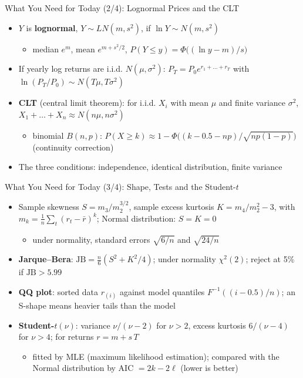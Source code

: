 \begin{frame}{What You Need for Today (2/4): Lognormal Prices and the CLT}
\itemsize{\footnotesize}
\begin{itemize}
    \item $Y$ is \textbf{lognormal}, $Y \sim LN(m, s^2)$, if $\ln Y \sim N(m, s^2)$
    \begin{itemize}
        \item median $e^m$, mean $e^{m + s^2/2}$, $P(Y \le y) = \Phi\big((\ln y - m)/s\big)$
    \end{itemize}
    \item If yearly log returns are i.i.d. $N(\mu, \sigma^2)$: $P_T = P_0 e^{r_1 + \dots + r_T}$ with $\ln(P_T/P_0) \sim N(T\mu, T\sigma^2)$
    \item \textbf{CLT} (central limit theorem): for i.i.d. $X_i$ with mean $\mu$ and finite variance $\sigma^2$, $X_1 + \dots + X_n \approx N(n\mu, n\sigma^2)$
    \begin{itemize}
        \item binomial $B(n, p)$: $P(X \ge k) \approx 1 - \Phi\big((k - 0.5 - np)/\sqrt{np(1-p)}\big)$ (continuity correction)
    \end{itemize}
    \item The three conditions: independence, identical distribution, finite variance
\end{itemize}
\end{frame}

\begin{frame}{What You Need for Today (3/4): Shape, Tests and the Student-$t$}
\itemsize{\footnotesize}
\begin{itemize}
    \item Sample skewness $S = m_3/m_2^{3/2}$, sample excess kurtosis $K = m_4/m_2^2 - 3$, with $m_k = \frac1n\sum_t (r_t - \bar r)^k$; Normal distribution: $S = K = 0$
    \begin{itemize}
        \item under normality, standard errors $\sqrt{6/n}$ and $\sqrt{24/n}$
    \end{itemize}
    \item \textbf{Jarque--Bera}: $\text{JB} = \frac{n}{6}(S^2 + K^2/4)$; under normality $\chi^2(2)$; reject at 5\% if $\text{JB} > 5.99$
    \item \textbf{QQ plot}: sorted data $r_{(i)}$ against model quantiles $F^{-1}((i - 0.5)/n)$; an S-shape means heavier tails than the model
    \item \textbf{Student-$t(\nu)$}: variance $\nu/(\nu-2)$ for $\nu > 2$, excess kurtosis $6/(\nu - 4)$ for $\nu > 4$; for returns $r = m + s\,T$
    \begin{itemize}
        \item fitted by MLE (maximum likelihood estimation); compared with the Normal distribution by AIC $= 2k - 2\ell$ (lower is better)
    \end{itemize}
\end{itemize}
\end{frame}

